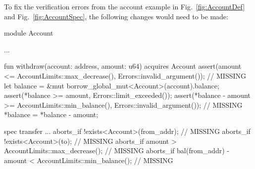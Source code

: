 \label{sec:CorrectedAccount}

To fix the verification errors from the account example in  Fig.~\ref{fig:AccountDef}
and Fig.~\ref{fig:AccountSpec}, the following changes would need to be made:

\begin{MoveBox}
module Account {
  ...

  fun withdraw(account: address, amount: u64) acquires Account {
    assert(amount <= AccountLimits::max_decrease(), Errors::invalid_argument()); // MISSING
    let balance = &mut borrow_global_mut<Account>(account).balance;
    assert(*balance >= amount, Errors::limit_exceeded());
    assert(*balance - amount >= AccountLimits::min_balance(), Errors::invalid_argument()); // MISSING
    *balance = *balance - amount;
  }

  spec transfer {
    ...
    aborts_if !exists<Account>(from_addr); // MISSING
    aborts_if !exists<Account>(to); // MISSING
    aborts_if amount > AccountLimits::max_decrease(); // MISSING
    aborts_if bal(from_addr) - amount < AccountLimits::min_balance(); // MISSING
  }
}
\end{MoveBox}


